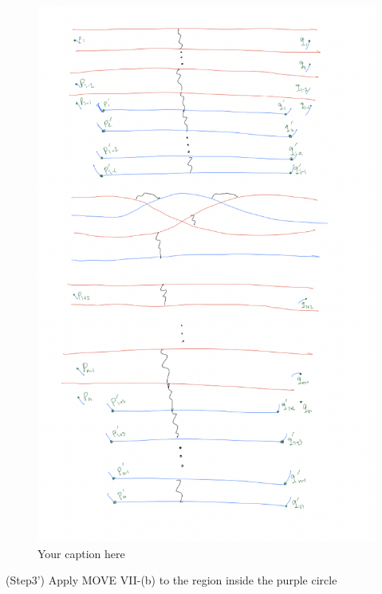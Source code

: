 \begin{figure}[H] %
    \centering
    \includegraphics[width=\linewidth]{diagrams/definition12/8.png} %
    \caption{Your caption here}
    \label{fig:your-label}
\end{figure}

(Step3') Apply MOVE \RN{7}-(b) to the region inside the purple circle

